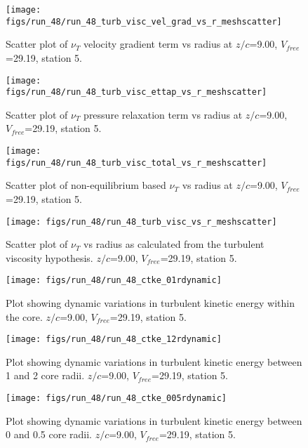 \begin{figure}[H]
\centering
\texttt{[image: figs/run\_48/run\_48\_turb\_visc\_vel\_grad\_vs\_r\_meshscatter]}
\caption{Scatter plot of $\nu_T$ velocity gradient term vs radius at $z/c$=9.00, $V_{free}$=29.19, station 5.}
\end{figure}


\begin{figure}[H]
\centering
\texttt{[image: figs/run\_48/run\_48\_turb\_visc\_ettap\_vs\_r\_meshscatter]}
\caption{Scatter plot of $\nu_T$ pressure relaxation term vs radius at $z/c$=9.00, $V_{free}$=29.19, station 5.}
\end{figure}


\begin{figure}[H]
\centering
\texttt{[image: figs/run\_48/run\_48\_turb\_visc\_total\_vs\_r\_meshscatter]}
\caption{Scatter plot of non-equilibrium based $\nu_T$ vs radius at $z/c$=9.00, $V_{free}$=29.19, station 5.}
\end{figure}


\begin{figure}[H]
\centering
\texttt{[image: figs/run\_48/run\_48\_turb\_visc\_vs\_r\_meshscatter]}
\caption{Scatter plot of $\nu_T$ vs radius as calculated from the turbulent viscosity hypothesis. $z/c$=9.00, $V_{free}$=29.19, station 5.}
\end{figure}


\begin{figure}[H]
\centering
\texttt{[image: figs/run\_48/run\_48\_ctke\_01rdynamic]}
\caption{Plot showing dynamic variations in turbulent kinetic energy within the core. $z/c$=9.00, $V_{free}$=29.19, station 5.}
\end{figure}


\begin{figure}[H]
\centering
\texttt{[image: figs/run\_48/run\_48\_ctke\_12rdynamic]}
\caption{Plot showing dynamic variations in turbulent kinetic energy between 1 and 2 core radii. $z/c$=9.00, $V_{free}$=29.19, station 5.}
\end{figure}


\begin{figure}[H]
\centering
\texttt{[image: figs/run\_48/run\_48\_ctke\_005rdynamic]}
\caption{Plot showing dynamic variations in turbulent kinetic energy between 0 and 0.5 core radii. $z/c$=9.00, $V_{free}$=29.19, station 5.}
\end{figure}


